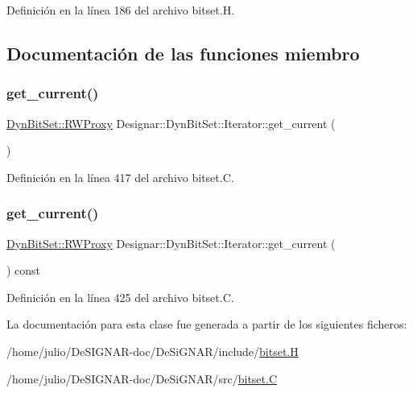 Definición en la línea 186 del archivo bitset.\+H.



\subsection{Documentación de las funciones miembro}
\mbox{\label{class_designar_1_1_dyn_bit_set_1_1_iterator_a413eba67b23a9400666c18845bbe795a}} 
\subsubsection{\texorpdfstring{get\+\_\+current()}{get\_current()}\hspace{0.1cm}{\footnotesize\ttfamily [1/2]}}
{\footnotesize\ttfamily \hyperlink{class_designar_1_1_dyn_bit_set_1_1_r_w_proxy}{Dyn\+Bit\+Set\+::\+R\+W\+Proxy} Designar\+::\+Dyn\+Bit\+Set\+::\+Iterator\+::get\+\_\+current (\begin{DoxyParamCaption}{ }\end{DoxyParamCaption})}



Definición en la línea 417 del archivo bitset.\+C.

\mbox{\label{class_designar_1_1_dyn_bit_set_1_1_iterator_a034af8ec4f70d792837cab4923799e9f}} 
\subsubsection{\texorpdfstring{get\+\_\+current()}{get\_current()}\hspace{0.1cm}{\footnotesize\ttfamily [2/2]}}
{\footnotesize\ttfamily \hyperlink{class_designar_1_1_dyn_bit_set_1_1_r_w_proxy}{Dyn\+Bit\+Set\+::\+R\+W\+Proxy} Designar\+::\+Dyn\+Bit\+Set\+::\+Iterator\+::get\+\_\+current (\begin{DoxyParamCaption}{ }\end{DoxyParamCaption}) const}



Definición en la línea 425 del archivo bitset.\+C.



La documentación para esta clase fue generada a partir de los siguientes ficheros\+:\begin{DoxyCompactItemize}
\item 
/home/julio/\+De\+S\+I\+G\+N\+A\+R-\/doc/\+De\+Si\+G\+N\+A\+R/include/\hyperlink{bitset_8_h}{bitset.\+H}\item 
/home/julio/\+De\+S\+I\+G\+N\+A\+R-\/doc/\+De\+Si\+G\+N\+A\+R/src/\hyperlink{bitset_8_c}{bitset.\+C}\end{DoxyCompactItemize}

